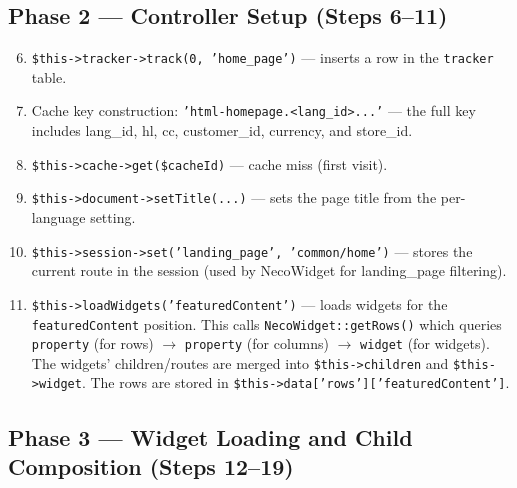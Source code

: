 \documentclass[11pt,a4paper]{article}
\begin{document}
\subsection{Phase 2 --- Controller Setup (Steps 6--11)}

\begin{enumerate}[leftmargin=1.6em,itemsep=2pt]
  \setcounter{enumi}{5}
  \item \texttt{\$this->tracker->track(0, 'home\_page')} ---
        inserts a row in the \texttt{tracker} table.
  \item Cache key construction: \texttt{'html-homepage.<lang\_id>...'}
        --- the full key includes lang\_id, hl, cc, customer\_id,
        currency, and store\_id.
  \item \texttt{\$this->cache->get(\$cacheId)} --- cache miss
        (first visit).
  \item \texttt{\$this->document->setTitle(...)} --- sets the page
        title from the per-language setting.
  \item \texttt{\$this->session->set('landing\_page', 'common/home')}
        --- stores the current route in the session (used by
        NecoWidget for landing\_page filtering).
  \item \texttt{\$this->loadWidgets('featuredContent')} ---
        loads widgets for the \texttt{featuredContent} position.
        This calls \texttt{NecoWidget::getRows()} which queries
        \texttt{property} (for rows) $\to$ \texttt{property} (for
        columns) $\to$ \texttt{widget} (for widgets). The widgets'
        children/routes are merged into \texttt{\$this->children}
        and \texttt{\$this->widget}. The rows are stored in
        \texttt{\$this->data['rows']['featuredContent']}.
\end{enumerate}

\subsection{Phase 3 --- Widget Loading and Child Composition (Steps 12--19)}
\end{document}

